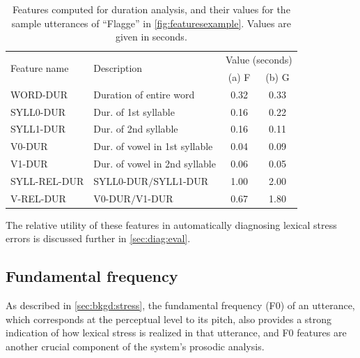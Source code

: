 \begin{table}[htb]
		\centering
		\caption[Features computed for duration analysis]{Features computed for duration analysis, and their values for the sample utterances of ``Flagge'' in \cref{fig:featuresexample}. Values are given in seconds.}
		\begin{tabularx}{\textwidth}{lXcc}
		\toprule
		\multirow{2}{*}{Feature name} 
									& \multirow{2}{*}{Description}
																	& \multicolumn{2}{c}{Value (seconds)} \\
					  				&												&  (a) F		& (b) G \\
		\midrule
		WORD-DUR 		&	Duration of entire word				& 0.32			& 0.33			\\
		SYLL0-DUR 		&	Dur. of 1st syllable						& 0.16			& 0.22			\\
		SYLL1-DUR 		&	Dur. of 2nd syllable				& 0.16			& 0.11			\\
		V0-DUR 				&	Dur. of vowel in 1st syllable		& 0.04			& 0.09			\\
		V1-DUR 				&	Dur. of vowel in 2nd syllable	& 0.06			& 0.05			\\
		SYLL-REL-DUR 	&	SYLL0-DUR$/$SYLL1-DUR 		& 1.00			& 2.00			\\
		V-REL-DUR 		&	V0-DUR$/$V1-DUR					& 0.67			& 1.80 			\\
		\bottomrule	
		\end{tabularx}
		\label{tab:durationfeatures}
\end{table}

The relative utility of these features in automatically diagnosing lexical stress errors is discussed further in \cref{sec:diag:eval}.


	\subsection{Fundamental frequency}
	\label{sec:prosody:f0}
	
	As described in \cref{sec:bkgd:stress}, the fundamental frequency (F0) of an utterance, which corresponds at the perceptual level to its pitch, also provides a strong indication of how lexical stress is realized in that utterance, and F0 features 
	are another crucial component of
	the system's prosodic analysis. 
	
	
